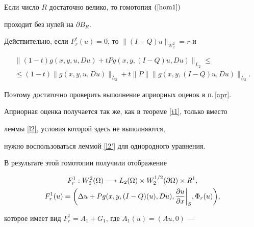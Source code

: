\begin{lem}


Если число $R$ достаточно велико, то гомотопия $(\ref{hom1})$


проходит без нулей на $\partial B_R$.


\end{lem}





\begin{pf}


Действительно, если $F_r^t(u)=0$, то $\|(I-Q)u\|_{W^2_2}=r$ и


\begin{multline*}


\|(1-t)g(x,y,u,Du)+tPg(x,y,(I-Q)u,Du)\|_{L_2}\le\\


%


\le (1-t)\|g(x,y,u,Du)\|_{L_2}+t\|P\|\|g(x,y,(I-Q)u,Du)\|_{L_2}.


\end{multline*}


Поэтому достаточно проверить выполнение априорных оценок в п.\,\ref{apr}.


Априорная оценка получается так же, как в теореме \ref{t1}, только вместо


леммы \ref{l2}, условия которой здесь не выполняются,


нужно воспользоваться леммой \ref{l2'} для однородного уравнения.


\end{pf}





В результате этой гомотопии получили отображение 


\begin{gather*}


F^1_r : W^2_2(\Omega)\longrightarrow 


L_2(\Omega)\times W^{1/2}_2(\partial \Omega)\times R^1,\\


%


F^1_r(u)=\bigg(\Delta u+Pg(x,y,(I-Q)(u),Du),


\fr{u}{x}\bigg|_S,


\Phi_r(u)\bigg),


\end{gather*}


которое имеет вид $F^1_r=A_1+G_1$, где $A_1(u)=(Au,0)$ ---


